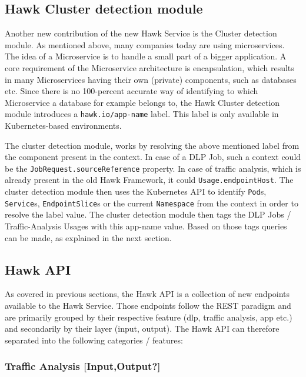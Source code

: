 \subsection{Hawk Cluster detection module}
Another new contribution of the new Hawk Service is the Cluster detection module.
As mentioned above, many companies today are using microservices. The idea of a Microservice is to handle a small part of a bigger application. A core requirement of the Microservice architecture is encapsulation, which results in many Microservices having their own (private) components, such as databases etc. Since there is no 100-percent accurate way of identifying to which Microservice a database for example belongs to, the Hawk Cluster detection module introduces a \texttt{hawk.io/app-name} label. This label is only available in Kubernetes-based environments.

The cluster detection module, works by resolving the above mentioned label from the component present in the context. In case of a DLP Job, such a context could be the \texttt{JobRequest.sourceReference} property. In case of traffic analysis, which is already present in the old Hawk Framework, it could \texttt{Usage.endpointHost}. The cluster detection module then uses the Kubernetes API to identify \texttt{Pod}s, \texttt{Service}s, \texttt{EndpointSlice}s or the current \texttt{Namespace} from the context in order to resolve the label value. The cluster detection module then tags the DLP Jobs / Traffic-Analysis Usages with this app-name value. Based on those tags queries can be made, as explained in the next section. 

\subsection{Hawk API}
As covered in previous sections, the Hawk API is a collection of new endpoints available to the Hawk Service.
Those endpoints follow the REST paradigm and are primarily grouped by their respective feature (dlp, traffic analysis, app etc.) and secondarily by their layer (input, output). The Hawk API can therefore separated into the following categories / features:

\subsubsection{Traffic Analysis [Input,Output?]}

